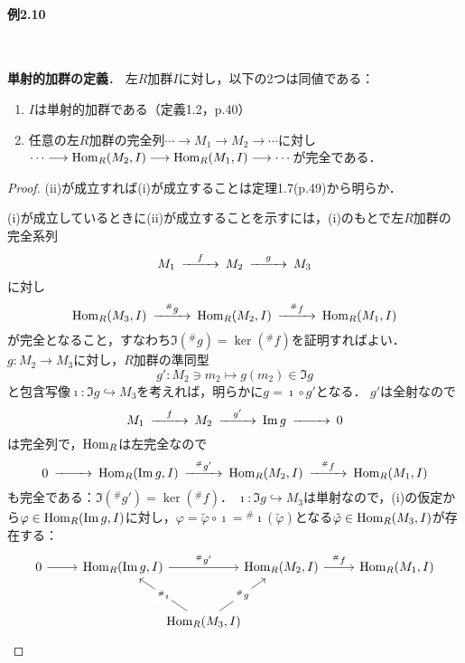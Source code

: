 \paragraph{例2.10}~
\begin{screen}
  \textbf{単射的加群の定義}．
  左$R$加群$I$に対し，以下の2つは同値である：
  \begin{enumerate}[label=(\roman*)]
    \item $I$は単射的加群である（定義1.2，p.40）
    \item 任意の左$R$加群の完全列$ \cdots \longrightarrow M_1 \longrightarrow M_2 \longrightarrow \cdots$に対し$ \cdots \longrightarrow \operatorname{Hom}_R(M_2, I) \longrightarrow \operatorname{Hom}_R(M_1, I) \longrightarrow \cdots$が完全である．
  \end{enumerate}
\end{screen}
\begin{proof}
  (ii)が成立すれば(i)が成立することは定理1.7(p.49)から明らか．

  (i)が成立しているときに(ii)が成立することを示すには，(i)のもとで左$R$加群の完全系列
  \[
  \begin{CD}
    M_1 @>{f}>> M_2 @>{g}>> M_3
  \end{CD}
  \]
  に対し
  \[
  \begin{CD}
    \Hom_R(M_3, I) @>{^\#g}>> \Hom_R(M_2, I) @>{^\#f}>> \Hom_R(M_1, I)
  \end{CD}
  \]
  が完全となること，すなわち$\Im(^\#g) = \ker (^\#f)$を証明すればよい．
  $g \colon M_2 \to M_3$に対し，$R$加群の準同型
  \[ g' \colon M_2 \ni m_2 \mapsto g(m_2) \in \Im g \]
  と包含写像$\imath \colon \Im g \hookrightarrow M_3$を考えれば，明らかに$g = \imath \circ g'$となる．
  $g'$は全射なので
  \[
  \begin{CD}
    M_1 @>{f}>> M_2 @>{g'}>> \Im g @>>> 0
  \end{CD}
  \]
  は完全列で，$\operatorname{Hom}_R$は左完全なので
  \[
  \begin{CD}
    0 @>>> \Hom_R(\Im g, I) @>{^\#g'}>> \Hom_R(M_2, I) @>{^\#f}>> \Hom_R(M_1, I)
  \end{CD}
  \]
  も完全である：$\Im(^\#g') = \ker (^\#f)$．
  $\imath \colon \Im g \hookrightarrow M_3$は単射なので，(i)の仮定から$\varphi \in \operatorname{Hom}_R(\operatorname{Im} g, I)$に対し，$\varphi = \tilde{\varphi} \circ \imath = {}^\#\imath (\tilde\varphi)$となる$\tilde{\varphi} \in \operatorname{Hom}_R(M_3, I)$が存在する：
  \[
  \begin{tikzcd}
    0 \arrow[r] & \Hom_R(\Im g, I) \arrow[rr, "^\#g'"] &[-30pt]&[-30pt] \Hom_R(M_2, I) \arrow[r, "^\#f"] & \Hom_R(M_1, I) \\[8pt]
    & & \Hom_R(M_3, I)\arrow[ul, "^\#\imath" description]\arrow[ur, "^\# g" description]
  \end{tikzcd}
  \]


\end{proof}
